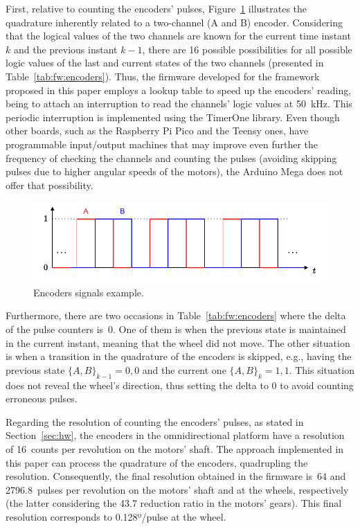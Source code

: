 \documentclass[conference]{IEEEtran}
\begin{document}
First, relative to counting the encoders' pulses, Figure~\ref{fig:fw:encoders} illustrates the quadrature inherently related to a two-channel (A and B) encoder.
Considering that the logical values of the two channels are known for the current time instant $k$ and the previous instant $k-1$,  there are 16 possible possibilities for all possible logic values of the last and current states of the two channels (presented in Table~\ref{tab:fw:encoders}).
Thus, the firmware developed for the framework proposed in this paper employs a lookup table to speed up the encoders' reading, being to attach an interruption to read the channels' logic values at 50~kHz.
This periodic interruption is implemented using the TimerOne library.
Even though other boards, such as the Raspberry Pi Pico and the Teensy ones, have programmable input/output machines that may improve even further the frequency of checking the channels and counting the pulses (avoiding skipping pulses due to higher angular speeds of the motors), the Arduino Mega does not offer that possibility.


\begin{figure}[!t]
\centering
\centerline{\includegraphics[width=0.8\columnwidth]{figures/encoders.pdf}}
\caption{Encoders signals example.}
\label{fig:fw:encoders}
\end{figure}



Furthermore, there are two occasions in Table~\ref{tab:fw:encoders} where the delta of the pulse counters is~0.
One of them is when the previous state is maintained in the current instant, meaning that the wheel did not move.
The other situation is when a transition in the quadrature of the encoders is skipped, e.g., having the previous state $\{A,B\}_{k-1}={0,0}$ and the current one $\{A,B\}_{k}={1,1}$.
This situation does not reveal the wheel's direction, thus setting the delta to 0 to avoid counting erroneous pulses.

Regarding the resolution of counting the encoders' pulses, as stated in Section~\ref{sec:hw}, the encoders in the omnidirectional platform have a resolution of 16~counts per revolution on the motors' shaft.
The approach implemented in this paper can process the quadrature of the encoders, quadrupling the resolution.
Consequently, the final resolution obtained in the firmware is~64 and 2796.8~pulses per revolution on the motors' shaft and at the wheels, respectively (the latter considering the 43.7 reduction ratio in the motors' gears). This final resolution corresponds to 0.128º/pulse at the wheel.
\end{document}
